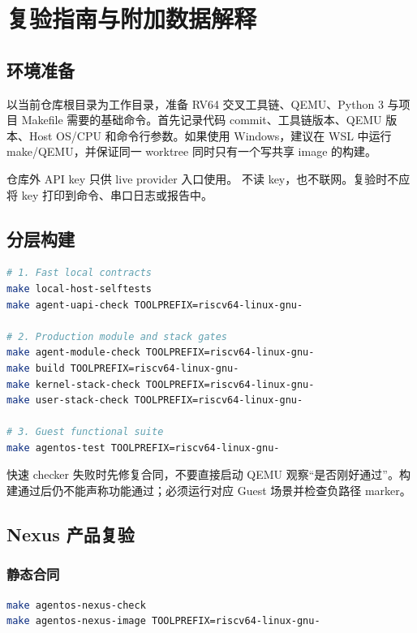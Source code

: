\chapter{复验指南与附加数据解释}
\label{app:reproduction}

\section{环境准备}

以当前仓库根目录为工作目录，准备 RV64 交叉工具链、QEMU、Python 3 与项目 Makefile 需要的基础命令。首先记录代码 commit、工具链版本、QEMU 版本、Host OS/CPU 和命令行参数。如果使用 Windows，建议在 WSL 中运行 make/QEMU，并保证同一 worktree 同时只有一个写共享 image 的构建。

仓库外 API key 只供 live provider 入口使用。 不读 key，也不联网。复验时不应将 key 打印到命令、串口日志或报告中。

\section{分层构建}

\begin{lstlisting}[language=bash,caption={建议的静态、编译与 Guest 回归顺序}]
# 1. Fast local contracts
make local-host-selftests
make agent-uapi-check TOOLPREFIX=riscv64-linux-gnu-

# 2. Production module and stack gates
make agent-module-check TOOLPREFIX=riscv64-linux-gnu-
make build TOOLPREFIX=riscv64-linux-gnu-
make kernel-stack-check TOOLPREFIX=riscv64-linux-gnu-
make user-stack-check TOOLPREFIX=riscv64-linux-gnu-

# 3. Guest functional suite
make agentos-test TOOLPREFIX=riscv64-linux-gnu-
\end{lstlisting}

快速 checker 失败时先修复合同，不要直接启动 QEMU 观察“是否刚好通过”。构建通过后仍不能声称功能通过；必须运行对应 Guest 场景并检查负路径 marker。

\section{Nexus 产品复验}

\subsection{静态合同}

\begin{lstlisting}[language=bash]
make agentos-nexus-check
make agentos-nexus-image TOOLPREFIX=riscv64-linux-gnu-
\end{lstlisting}

